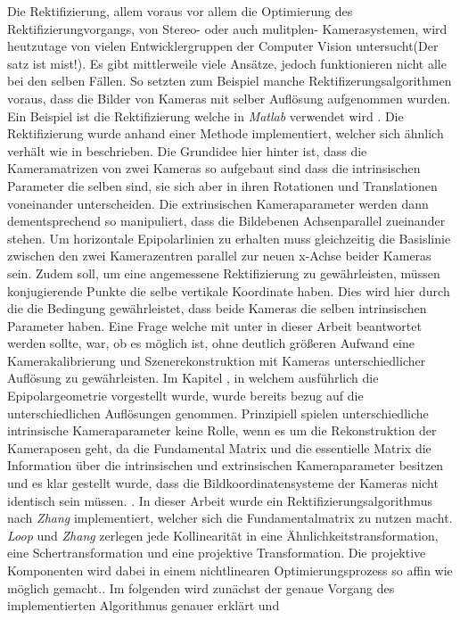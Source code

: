 Die Rektifizierung, allem voraus vor allem die Optimierung des Rektifizierungvorgangs, von Stereo- oder auch mulitplen- Kamerasystemen, wird heutzutage von vielen Entwicklergruppen der Computer Vision untersucht(Der satz ist mist!). Es gibt mittlerweile viele Ansätze, jedoch funktionieren nicht alle bei den selben Fällen. So setzten zum Beispiel manche Rektifizerungsalgorithmen voraus, dass die Bilder von Kameras mit selber Auflösung aufgenommen wurden. Ein Beispiel ist die Rektifizierung welche in \textit{Matlab} verwendet wird \cite{MatlabRec}. Die Rektifizierung wurde anhand einer Methode implementiert, welcher sich ähnlich verhält wie in \cite{FusielloSite} beschrieben. Die Grundidee hier hinter ist, dass die Kameramatrizen von zwei Kameras so aufgebaut sind dass die intrinsischen Parameter die selben sind, sie sich aber in ihren Rotationen und Translationen voneinander unterscheiden. Die extrinsischen Kameraparameter werden dann dementsprechend so manipuliert, dass die Bildebenen Achsenparallel zueinander stehen\cite{FusielloSite,Fusiello}. Um horizontale Epipolarlinien zu erhalten muss gleichzeitig die Basislinie zwischen den zwei Kamerazentren parallel zur neuen x-Achse beider Kameras sein. Zudem soll, um eine angemessene Rektifizierung zu gewährleisten, müssen konjugierende Punkte die selbe vertikale Koordinate haben. Dies wird hier durch die die Bedingung gewährleistet, dass beide Kameras die selben intrinsischen Parameter haben\cite{FusielloSite}. Eine Frage welche mit unter in dieser Arbeit beantwortet werden sollte, war, ob es möglich ist, ohne deutlich größeren Aufwand eine Kamerakalibrierung und Szenerekonstruktion mit Kameras unterschiedlicher Auflösung zu gewährleisten. Im Kapitel , in welchem ausführlich die Epipolargeometrie vorgestellt wurde, wurde bereits bezug auf die unterschiedlichen Auflösungen genommen. Prinzipiell spielen unterschiedliche intrinsische Kameraparameter keine Rolle, wenn es um die Rekonstruktion der Kameraposen geht, da die Fundamental Matrix und die essentielle Matrix die Information über die intrinsischen und extrinsischen Kameraparameter besitzen und es klar gestellt wurde, dass die Bildkoordinatensysteme der Kameras nicht identisch sein müssen. \cite{Elements}. In dieser Arbeit wurde ein Rektifizierungsalgorithmus nach \textit{Zhang}\cite{ZZ} implementiert, welcher sich die Fundamentalmatrix zu nutzen macht. \textit{Loop} und \textit{Zhang} zerlegen jede Kollinearität in eine Ähnlichkeitstransformation, eine Schertransformation und eine projektive Transformation. Die projektive Komponenten wird dabei in einem nichtlinearen Optimierungsprozess so affin wie möglich gemacht.\cite{Fusiello,ZZ}. Im folgenden wird zunächst der genaue Vorgang des implementierten Algorithmus genauer erklärt und 

